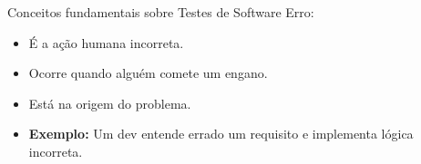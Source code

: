\begin{frame}{Conceitos fundamentais sobre Testes de Software}
    Erro:
    \begin{itemize}
        \item É a ação humana incorreta.
        \item Ocorre quando alguém comete um engano.
        \item Está na origem do problema.
        \item \textbf{Exemplo:} Um dev entende errado um requisito e implementa lógica incorreta.
    \end{itemize}
\end{frame}